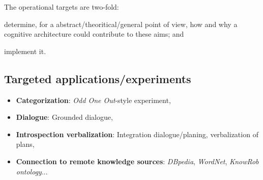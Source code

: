 The operational targets are two-fold:

\begin{inparaenum}

	\item determine, for a abstract/theoritical/general point of view, how and
	why a cognitive architecture could contribute to these aims; and

	\item implement it.

\end{inparaenum}

\subsection{Targeted applications/experiments}
\label{sect|targeted-applications-experiments}

\begin{itemize}
	\item \textbf{Categorization}: \emph{Odd One Out}-style experiment,
	\item \textbf{Dialogue}: Grounded dialogue,
	\item \textbf{Introspection verbalization}: Integration dialogue/planing, verbalization of plans,
	\item \textbf{Connection to remote knowledge sources}: \emph{DBpedia}, \emph{WordNet}, \emph{KnowRob ontology}...
\end{itemize}
